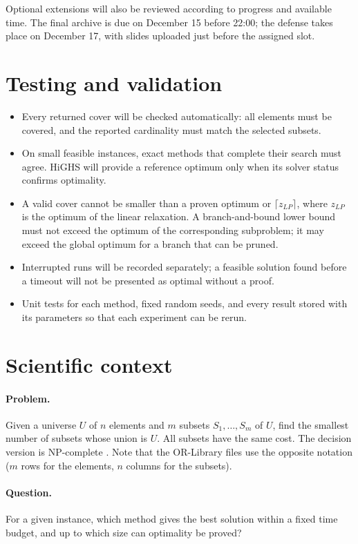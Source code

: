 \documentclass[a4paper,11pt]{article}
\begin{document}
Optional extensions will also be reviewed according to progress and available time. The final archive is due on December 15 before 22:00; the defense takes place on December 17, with slides uploaded just before the assigned slot.

\section{Testing and validation}

\begin{itemize}
  \item Every returned cover will be checked automatically: all elements must be covered, and the reported cardinality must match the selected subsets.
  \item On small feasible instances, exact methods that complete their search must agree. HiGHS will provide a reference optimum only when its solver status confirms optimality.
  \item A valid cover cannot be smaller than a proven optimum or $\lceil z_{LP} \rceil$, where $z_{LP}$ is the optimum of the linear relaxation. A branch-and-bound lower bound must not exceed the optimum of the corresponding subproblem; it may exceed the global optimum for a branch that can be pruned.
  \item Interrupted runs will be recorded separately; a feasible solution found before a timeout will not be presented as optimal without a proof.
  \item Unit tests for each method, fixed random seeds, and every result stored with its parameters so that each experiment can be rerun.
\end{itemize}

\section{Scientific context}

\paragraph{Problem.} Given a universe $U$ of $n$ elements and $m$ subsets $S_1, \dots, S_m$ of $U$, find the smallest number of subsets whose union is $U$. All subsets have the same cost. The decision version is NP-complete \cite{karp1972}. Note that the OR-Library files use the opposite notation ($m$ rows for the elements, $n$ columns for the subsets).

\paragraph{Question.} For a given instance, which method gives the best solution within a fixed time budget, and up to which size can optimality be proved?
\end{document}
